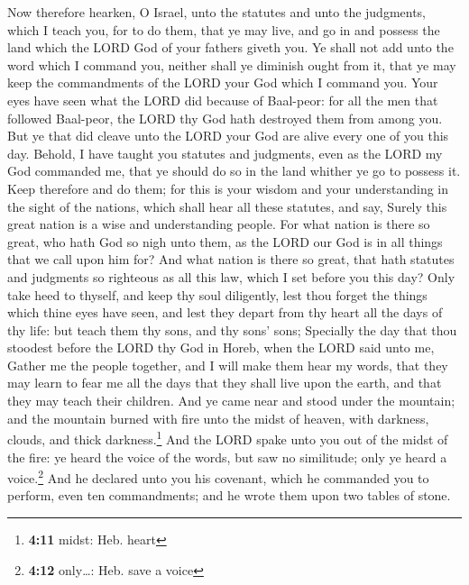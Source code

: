  Now therefore hearken, O Israel, unto the statutes and
unto the judgments, which I teach you, for to do them, that ye may live,
and go in and possess the land which the LORD God of your fathers giveth
you.  Ye shall not add unto the word which I command you,
neither shall ye diminish ought from it, that ye may keep the
commandments of the LORD your God which I command you. 
Your eyes have seen what the LORD did because of Baal-peor: for all the
men that followed Baal-peor, the LORD thy God hath destroyed them from
among you.  But ye that did cleave unto the LORD your God
are alive every one of you this day.  Behold, I have
taught you statutes and judgments, even as the LORD my God commanded me,
that ye should do so in the land whither ye go to possess it.
 Keep therefore and do them; for this is your wisdom and
your understanding in the sight of the nations, which shall hear all
these statutes, and say, Surely this great nation is a wise and
understanding people.  For what nation is there so great,
who hath God so nigh unto them, as the LORD our God is in all things
that we call upon him for?  And what nation is there so
great, that hath statutes and judgments so righteous as all this law,
which I set before you this day?  Only take heed to
thyself, and keep thy soul diligently, lest thou forget the things which
thine eyes have seen, and lest they depart from thy heart all the days
of thy life: but teach them thy sons, and thy sons' sons;
 Specially the day that thou stoodest before the LORD thy
God in Horeb, when the LORD said unto me, Gather me the people together,
and I will make them hear my words, that they may learn to fear me all
the days that they shall live upon the earth, and that they may teach
their children.  And ye came near and stood under the
mountain; and the mountain burned with fire unto the midst of heaven,
with darkness, clouds, and thick darkness.\footnote{\textbf{4:11} midst:
  Heb. heart}  And the LORD spake unto you out of the
midst of the fire: ye heard the voice of the words, but saw no
similitude; only ye heard a voice.\footnote{\textbf{4:12} only\ldots:
  Heb. save a voice}  And he declared unto you his
covenant, which he commanded you to perform, even ten commandments; and
he wrote them upon two tables of stone.

